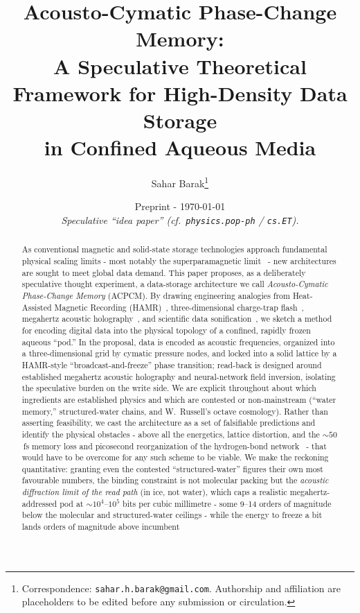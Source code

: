 \documentclass[11pt]{article}
\title{\bfseries\color{acpcmblue}\Large Acousto-Cymatic Phase-Change Memory:\\[2pt]
A Speculative Theoretical Framework for High-Density Data Storage\\ in Confined Aqueous Media}
\author[1]{Sahar Barak\thanks{Correspondence: \texttt{sahar.h.barak@gmail.com}. Authorship and affiliation are placeholders to be edited before any submission or circulation.}}
\affil[1]{Independent Researcher}
\date{\small Preprint - \today \\[2pt] \emph{Speculative ``idea paper'' (cf.\ \texttt{physics.pop-ph} / \texttt{cs.ET}).}}
\theoremstyle{definition}
\begin{document}
\maketitle
\thispagestyle{plain}

\begin{abstract}
\noindent
As conventional magnetic and solid-state storage technologies approach fundamental
physical scaling limits - most notably the superparamagnetic limit~\cite{charap1997,wellermoser1999} - new
architectures are sought to meet global data demand. This paper proposes, as a
deliberately speculative thought experiment, a data-storage architecture we call
\emph{Acousto-Cymatic Phase-Change Memory} (ACPCM). By drawing engineering analogies
from Heat-Assisted Magnetic Recording (HAMR)~\cite{kryder2008hamr}, three-dimensional
charge-trap flash~\cite{white2000sonos,tanaka2007bics}, megahertz acoustic
holography~\cite{melde2016holograms}, and scientific data
sonification~\cite{hermann2011handbook}, we sketch a method for encoding digital data
into the physical topology of a confined, rapidly frozen aqueous ``pod.'' In the
proposal, data is encoded as acoustic frequencies, organized into a three-dimensional
grid by cymatic pressure nodes, and locked into a solid lattice by a HAMR-style
``broadcast-and-freeze'' phase transition; read-back is designed around established
megahertz acoustic holography and neural-network field inversion, isolating the
speculative burden on the write side. We are explicit throughout about which
ingredients are established physics and which are contested or non-mainstream
(``water memory,'' structured-water chains, and W.~Russell's octave cosmology). Rather
than asserting feasibility, we cast the architecture as a set of falsifiable predictions
and identify the physical obstacles - above all the energetics, lattice distortion, and
the ${\sim}50$\,fs memory loss and picosecond reorganization of the hydrogen-bond
network~\cite{cowan2005water} - that would have to be overcome for any such scheme to be
viable. We make the reckoning quantitative: granting even the contested ``structured-water''
figures their own most favourable numbers, the binding constraint is not molecular packing
but the \emph{acoustic diffraction limit of the read path} (in ice, not water), which caps a
realistic megahertz-addressed pod at ${\sim}10^{4}$--$10^{5}$ bits per cubic millimetre -
some 9--14 orders of magnitude below the molecular and structured-water ceilings - while the
energy to freeze a bit lands orders of magnitude above incumbent

\end{abstract}
\end{document}
